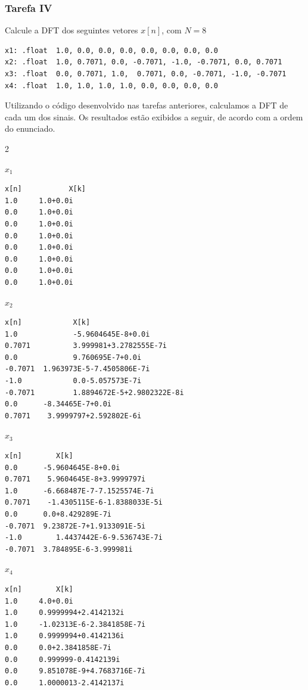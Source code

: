 \documentclass[a4paper,12pt]{article}
\begin{document}
\subsubsection{Tarefa IV}
\begin{tcolorbox}[title=Enunciado, colback=blue!5!white, colframe=blue!75!black]
Calcule a DFT dos seguintes vetores $x[n]$, com $N=8$
\begin{verbatim}
x1: .float  1.0, 0.0, 0.0, 0.0, 0.0, 0.0, 0.0, 0.0 
x2: .float  1.0, 0.7071, 0.0, -0.7071, -1.0, -0.7071, 0.0, 0.7071 
x3: .float  0.0, 0.7071, 1.0,  0.7071, 0.0, -0.7071, -1.0, -0.7071 
x4: .float  1.0, 1.0, 1.0, 1.0, 0.0, 0.0, 0.0, 0.0 
\end{verbatim}
\end{tcolorbox}
Utilizando o código desenvolvido nas tarefas anteriores, calculamos a DFT de cada um dos sinais. Os resultados estão exibidos a seguir, de acordo com a ordem do enunciado.

\begin{multicols}{2}
    \begin{codebox}{$x_1$}
    \begin{verbatim}
x[n]           X[k]
1.0	    1.0+0.0i
0.0	    1.0+0.0i
0.0	    1.0+0.0i
0.0	    1.0+0.0i
0.0	    1.0+0.0i
0.0	    1.0+0.0i
0.0	    1.0+0.0i
0.0	    1.0+0.0i
    \end{verbatim}
    \end{codebox}
    
    \begin{codebox}{$x_2$}
    \begin{verbatim}
x[n]            X[k]
1.0             -5.9604645E-8+0.0i
0.7071          3.999981+3.2782555E-7i
0.0             9.760695E-7+0.0i
-0.7071	 1.963973E-5-7.4505806E-7i
-1.0            0.0-5.057573E-7i
-0.7071         1.8894672E-5+2.9802322E-8i
0.0	     -8.34465E-7+0.0i
0.7071	  3.9999797+2.592802E-6i
    \end{verbatim}
    \end{codebox}
\columnbreak
    \begin{codebox}{$x_3$}
    \begin{verbatim}
x[n]	    X[k]
0.0	     -5.9604645E-8+0.0i
0.7071	  5.9604645E-8+3.9999797i
1.0	     -6.668487E-7-7.1525574E-7i
0.7071	  -1.4305115E-6-1.8388033E-5i
0.0	     0.0+8.429289E-7i
-0.7071	 9.23872E-7+1.9133091E-5i
-1.0	    1.4437442E-6-9.536743E-7i
-0.7071	 3.784895E-6-3.999981i
    \end{verbatim}
    \end{codebox}
    
    \begin{codebox}{$x_4$}
    \begin{verbatim}
x[n]	    X[k]
1.0	    4.0+0.0i
1.0	    0.9999994+2.4142132i
1.0	    -1.02313E-6-2.3841858E-7i
1.0	    0.9999994+0.4142136i
0.0	    0.0+2.3841858E-7i
0.0	    0.999999-0.4142139i
0.0	    9.851078E-9+4.7683716E-7i
0.0	    1.0000013-2.4142137i
    \end{verbatim}
    \end{codebox}
\end{multicols}
\end{document}
